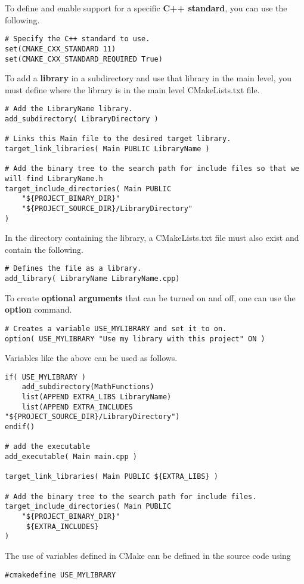 To define and enable support for a specific \textbf{C++ standard}, you can use the following.
\begin{lstlisting}
# Specify the C++ standard to use.
set(CMAKE_CXX_STANDARD 11)
set(CMAKE_CXX_STANDARD_REQUIRED True)
\end{lstlisting}

To add a \textbf{library} in a subdirectory and use that library in the main level, you must define where the library is in the main level CMakeLists.txt file.
\begin{lstlisting}
# Add the LibraryName library.
add_subdirectory( LibraryDirectory )

# Links this Main file to the desired target library.
target_link_libraries( Main PUBLIC LibraryName )

# Add the binary tree to the search path for include files so that we will find LibraryName.h
target_include_directories( Main PUBLIC
	"${PROJECT_BINARY_DIR}"
	"${PROJECT_SOURCE_DIR}/LibraryDirectory"
)
\end{lstlisting}

In the directory containing the library, a CMakeLists.txt file must also exist and contain the following.
\begin{lstlisting}
# Defines the file as a library.
add_library( LibraryName LibraryName.cpp)
\end{lstlisting}

To create \textbf{optional arguments} that can be turned on and off, one can use the \textbf{option} command.
\begin{lstlisting}
# Creates a variable USE_MYLIBRARY and set it to on.
option( USE_MYLIBRARY "Use my library with this project" ON )
\end{lstlisting}

Variables like the above can be used as follows.
\begin{lstlisting}
if( USE_MYLIBRARY )
	add_subdirectory(MathFunctions)
	list(APPEND EXTRA_LIBS LibraryName)
	list(APPEND EXTRA_INCLUDES "${PROJECT_SOURCE_DIR}/LibraryDirectory")
endif()

# add the executable
add_executable( Main main.cpp )

target_link_libraries( Main PUBLIC ${EXTRA_LIBS} )

# Add the binary tree to the search path for include files.
target_include_directories( Main PUBLIC
	"${PROJECT_BINARY_DIR}"
	 ${EXTRA_INCLUDES}
)
\end{lstlisting}

The use of variables defined in CMake can be defined in the source code using
\begin{lstlisting}
#cmakedefine USE_MYLIBRARY
\end{lstlisting}

